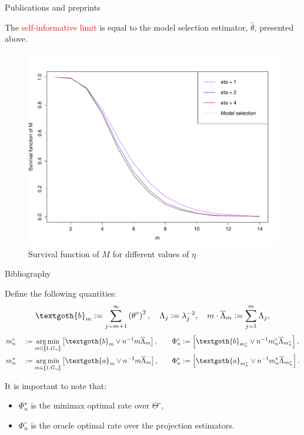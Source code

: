 \documentclass[final,hyperref={pdfpagelabels=false}]{beamer}
\DeclareMathOperator*{\argmin}{arg\,min}
\begin{document}
\begin{frame}[t]
\begin{columns}[t]
\begin{column}{.30\textwidth}
\begin{block}{\rule{0pt}{2.5ex} Publications and preprints}
\medskip

The \textcolor{red}{self-informative limit} is equal to the model selection estimator, $\widehat{\theta}$, presented above.

\begin{figure}[H]
\caption{Survival function of $M$ for different values of $\eta$}
\includegraphics[width=0.5\linewidth]{iteration.pdf}\hfill
\end{figure}

\end{block}


\begin{block}{\rule{0pt}{2.5ex} Bibliography}
Define the following quantities:
\[\textgoth{b}_{m} := \sum\limits_{j = m + 1}^{\infty} \left(\theta^{\circ}\right)^{2}, \quad \Lambda_{j} := \lambda_{j}^{-2}, \quad m \cdot \overline{\Lambda}_{m} := \sum\limits_{j = 1}^{m} \Lambda_{j},\]
\begin{alignat*}{3}
&m_{n}^{\circ} &&:= \argmin\limits_{m \in \llbracket 1, G_{n} \rrbracket} \left[\textgoth{b}_{m} \vee n^{-1} m \overline{\Lambda}_{m}\right], && \quad \Phi_{n}^{\circ} := \left[\textgoth{b}_{m_{n}^{\circ}}\vee n^{-1} m_{n}^{\circ} \overline{\Lambda}_{m_{n}^{\circ}}\right],\\
&m_{n}^{\star} &&:= \argmin\limits_{m \in \llbracket 1, G_{n} \rrbracket} \left[\textgoth{a}_{m} \vee n^{-1} m \overline{\Lambda}_{m}\right], && \quad \Phi_{n}^{\star} := \left[\textgoth{a}_{m_{n}^{\star}} \vee n^{-1} m_{n}^{\star} \overline{\Lambda}_{m_{n}^{\star}}\right].
\end{alignat*}

It is important to note that:
\begin{itemize}
\item $\Phi_{n}^{\star}$ is the minimax optimal rate over $\Theta^{\circ}$,
\item $\Phi_{n}^{\circ}$ is the oracle optimal rate over the projection estimators.
\end{itemize}
\end{block}


\end{column}
\end{columns}
\end{frame}
\end{document}
